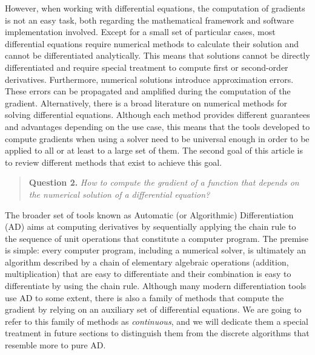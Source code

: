 However, when working with differential equations, the computation of gradients is not an easy task, both regarding the mathematical framework and software implementation involved. 
Except for a small set of particular cases, most differential equations require numerical methods to calculate their solution and cannot be differentiated analytically. 
This means that solutions cannot be directly differentiated and require special treatment to compute first or second-order derivatives. 
Furthermore, numerical solutions introduce approximation errors. 
These errors can be propagated and amplified during the computation of the gradient. 
Alternatively, there is a broad literature on numerical methods for solving differential equations. 
Although each method provides different guarantees and advantages depending on the use case, this means that the tools developed to compute gradients when using a solver need to be universal enough in order to be applied to all or 
at least to a large set of them. 
The second goal of this article is to review different methods that exist to achieve this goal.
\begin{quote}
    \textbf{Question 2. }
    \textit{How to compute the gradient of a function that depends on the numerical solution of a differential equation?}
\end{quote}

The broader set of tools known as Automatic (or Algorithmic) Differentiation (AD) aims at computing derivatives by sequentially applying the chain rule to the sequence of unit operations that constitute a computer program\cite{Griewank:2008kh, Naumann.2011}. 
The premise is simple: every computer program, including a numerical solver, is ultimately an algorithm described by a chain of elementary algebraic operations (addition, multiplication) that are easy to differentiate and their combination is easy to differentiate by using the chain rule\cite{Giering:1998in}. 
Although many modern differentiation tools use AD to some extent, there is also a family of methods that compute the gradient by relying on an auxiliary set of differential equations. 
We are going to refer to this family of methods as \textit{continuous}, and we will dedicate them a special treatment in future sections to distinguish them from the discrete algorithms that resemble more to pure AD. 


